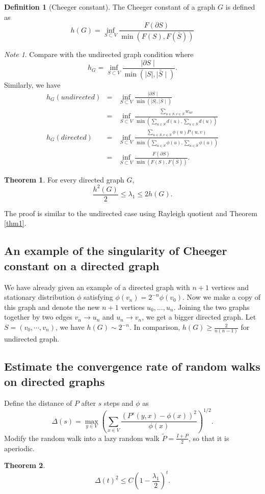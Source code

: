 \documentclass[twoside]{article}
\theoremstyle{definition}
\newtheorem{thm}{Theorem}[section]
\theoremstyle{definition}
\newtheorem*{defn}{Definition}
\theoremstyle{remark}
\newtheorem*{note}{Note}
\begin{document}
  \begin{defn}[Cheeger constant]
  The Cheeger constant of a graph $G$ is defined as
  \[h(G)=\inf_{S \subset V}\frac{F(\partial S)} {\min \left( F(S), F(\bar{S}) \right)}\]
  \end{defn}
  \begin{note}
  Compare with the undirected graph condition where
  \[h_G=\inf_{S \subset V}\frac{\mid\partial S\mid} {\min \left( \mid S \mid, \mid \bar{S}\mid \right)}.\]
  Similarly, we have
  \begin{eqnarray*}
  h_G(undirected) &=& \inf_{S \subset V}\frac{\mid\partial S\mid} {\min \left( \mid S \mid, \mid \bar{S}\mid \right)} \\
       &=& \inf_{S \subset V}\frac{\sum_{u\in S,v\in \bar{S}}w_{uv}} {\min \left( \sum_{u\in S} d(u), \sum_{u\in \bar{S}}d(u) \right)} \\
h_G(directed)&=& \inf_{S \subset V}\frac{\sum_{u\in S,v\in \bar{S}}\phi(u)P(u,v)} {\min \left( \sum_{u\in S} \phi(u), \sum_{u\in \bar{S}}\phi(u) \right)} \\
       &=& \inf_{S \subset V}\frac{F(\partial S)} {\min \left( F(S), F(\bar{S}) \right)}.
  \end{eqnarray*}
  \end{note}

  \begin{thm} For every directed graph $G$,
  \[\frac{h^2(G)}{2} \leq \lambda_1 \leq 2h(G).\]
  \end{thm}
  The proof is similar to the undirected case using Rayleigh quotient and Theorem \ref{thm1}.

\subsection{An example of the singularity of Cheeger constant on a directed graph}
  We have already given an example of a directed graph with $n+1$ vertices and stationary distribution $\phi$ satisfying $\phi(v_n)=2^{-n}\phi(v_0)$.
  Now we make a copy of this graph and denote the new $n+1$ vertices $u_0, \dots, u_n$. Joining the two graphs together by two edges $v_n \rightarrow u_n$ and $u_n \rightarrow v_n$, we get a bigger directed graph.
  Let $S=(v_0,\cdots,v_n)$, we have $h(G)\sim 2^{-n}$.
  In comparison, $h(G)\geq \frac{2}{n(n-1)}$ for undirected graph.

\subsection{Estimate the convergence rate of random walks on directed graphs}
  Define the distance of $P$ after $s$ steps and $\phi$ as
  \[\Delta(s)=\max_{y\in V}\left( \sum_{x\in V} \frac{(P^s(y,x)-\phi(x))^2} {\phi(x)}\right)^{1/2}.\]
  Modify the random walk into a lazy random walk $\tilde{P}=\frac{I+P}{2}$, so that it is aperiodic.
  \begin{thm}
  \[\Delta(t)^2\leq C(1-\frac{\lambda_1}{2})^t.\]
  \end{thm}
\end{document}
